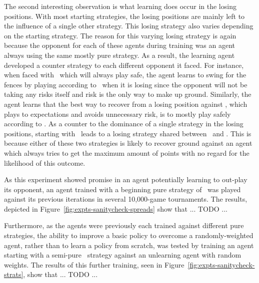 The second interesting observation is what learning does occur
in the losing positions.
%
With most starting strategies,
the losing positions are mainly left to the influence of a single
other strategy.
%
This losing strategy also varies depending on the starting strategy.
%
The reason for this varying losing strategy is again
because the opponent for each of these agents during training
was an agent always using the same mostly pure strategy.
%
As a result,
the learning agent developed a counter strategy to each different
opponent it faced.
%
For instance,
when faced with \handmaxmin\ which will always play safe,
the agent learns to swing for the fences by playing according to \handmaxposs\ 
when it is losing
since the opponent will not be taking any risks itself
and risk is the only way to make up ground.
%
Similarly,
the agent learns that the best way to recover from a losing position
against \handmaxavg,
which plays to expectations and avoids unnecessary risk,
is to mostly play safely according to \handmaxmin.
%
As a counter to the dominance of a single strategy in the losing positions,
starting with \handmaxposs\ leads to a losing strategy
shared between \handmaxavg\ and \handmaxmed.
%
This is because either of these two strategies is likely to recover ground
against an agent which always tries to get the maximum amount of points
with no regard for the likelihood of this outcome.



As this experiment showed promise in an agent potentially learning
to out-play its opponent,
an agent trained with a beginning pure strategy of \handmaxavg\ was played
against its previous iterations in several 10,000-game tournaments.
%
The results,
depicted in Figure~\ref{fig:expts-sanitycheck-spreads}
show that ... TODO ...



Furthermore,
as the agents were previously each trained against different pure strategies,
the ability to improve a basic policy to overcome a randomly-weighted agent,
rather than to learn a policy from scratch,
was tested by training an agent starting with a semi-pure
\handmaxavg\ strategy against an unlearning agent with random weights.
%
The results of this further training,
seen in Figure~\ref{fig:expts-sanitycheck-strats},
show that ... TODO ...



